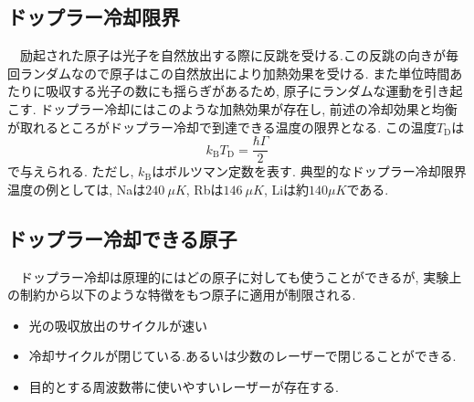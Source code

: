 \documentclass[uplatex, dvipdfmx, a4paper, report, papersize, 11pt]{jsbook}
\begin{document}
\subsection{ドップラー冷却限界}
　励起された原子は光子を自然放出する際に反跳を受ける.この反跳の向きが毎回ランダムなので原子はこの自然放出により加熱効果を受ける. また単位時間あたりに吸収する光子の数にも揺らぎがあるため, 原子にランダムな運動を引き起こす.
ドップラー冷却にはこのような加熱効果が存在し, 前述の冷却効果と均衡が取れるところがドップラー冷却で到達できる温度の限界となる. この温度$T _ { \mathrm { D } }$は
\begin{equation}
  k _ { \mathrm { B } } T _ { \mathrm { D } } = \frac { \hbar \Gamma } { 2 }
\end{equation}
で与えられる. ただし, $k _ { \mathrm { B } }$はボルツマン定数を表す. 典型的なドップラー冷却限界温度の例としては, Naは$240\ \mu K$, Rbは$146\ \mu K$, Liは約$140 \mu K$である\cite{PhysRevX.6.041004, 気体原子のレーザー冷却, ubcthesis}.
\subsection{ドップラー冷却できる原子}
　ドップラー冷却は原理的にはどの原子に対しても使うことができるが, 実験上の制約から以下のような特徴をもつ原子に適用が制限される\cite{ノーベル賞と分光学}.
\begin{itemize}
  \item 光の吸収放出のサイクルが速い
  \item 冷却サイクルが閉じている.あるいは少数のレーザーで閉じることができる.
  \item 目的とする周波数帯に使いやすいレーザーが存在する.
\end{itemize}

\newpage
\end{document}
